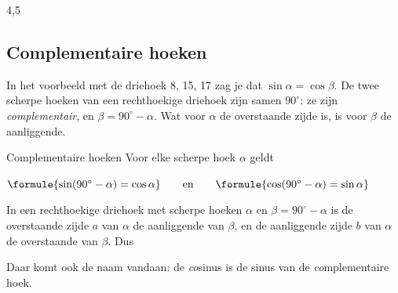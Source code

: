 
\begin{oefeningen}
\end{oefeningen}

\begin{alleenvoor}{4,5}
\subsection{Complementaire hoeken}

In het voorbeeld met de driehoek 8, 15, 17 zag je dat $\sin\alpha = \cos\beta$. De twee scherpe hoeken van een rechthoekige driehoek zijn samen $90^\circ$: ze zijn \emph{complementair}, en $\beta = 90^\circ - \alpha$. Wat voor $\alpha$ de overstaande zijde is, is voor $\beta$ de aanliggende.

\begin{theorie}
\begin{stelling}{Complementaire hoeken}
Voor elke scherpe hoek $\alpha$ geldt

\vspace{1mm}
\qquad $\formule{\sin(90^\circ - \alpha) = \cos\alpha} \qquad \text{en} \qquad \formule{\cos(90^\circ - \alpha) = \sin\alpha}$
\end{stelling}

\begin{bewijs}
In een rechthoekige driehoek met scherpe hoeken $\alpha$ en $\beta = 90^\circ - \alpha$ is de overstaande zijde $a$ van $\alpha$ de aanliggende van $\beta$, en de aanliggende zijde $b$ van $\alpha$ de overstaande van $\beta$. Dus
\end{bewijs}
\end{theorie}

Daar komt ook de naam vandaan: de \textit{co}sinus is de sinus van de \textit{co}mplementaire hoek.


\end{alleenvoor}
